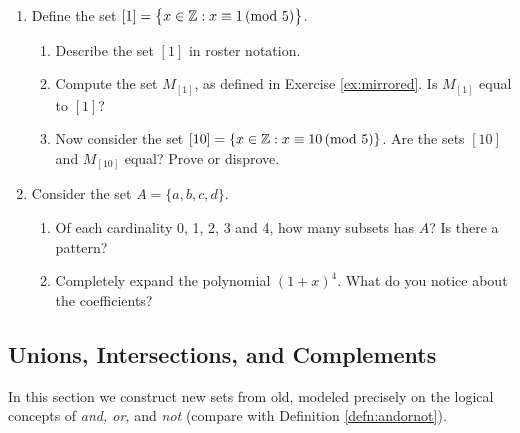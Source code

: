 \begin{exercises}{}{}
\begin{enumerate}
  \item Define the set $[1]=\bigl\{x\in\mathbb{Z}: x\equiv 1\negthickspace\pmod{5}\bigr\}$.
		\begin{enumerate}
		  \item Describe the set $[1]$ in roster notation.
		  \item Compute the set $M_{[1]}$, as defined in Exercise \ref{ex:mirrored}. Is $M_{[1]}$ equal to $[1]$?
			\item Now consider the set $[10]=\{x\in\mathbb{Z}:x\equiv 10\negthickspace\pmod{5}\}$. Are the sets $[10]$ and $M_{[10]}$ equal? Prove or disprove.
  	\end{enumerate}


    

		\item Consider the set $A=\{a,b,c,d\}$. 
    \begin{enumerate}
      \item Of each cardinality 0, 1, 2, 3 and 4, how many subsets has $A$? Is there a pattern?
        
      \item Completely expand the polynomial $(1 + x)^4$. What do you notice about the coefficients? 
    \end{enumerate}

	\end{enumerate}
\end{exercises}

\clearpage



\subsection{Unions, Intersections, and Complements}\label{sec:union}

In this section we construct new sets from old, modeled precisely on the logical concepts of \emph{and, or,} and \emph{not} (compare with Definition \ref{defn:andornot}). 


